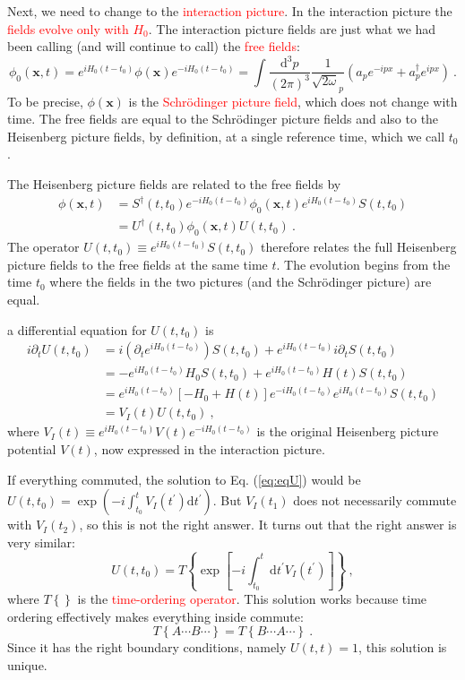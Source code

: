 \documentclass[11pt,a4paper]{article}
\renewcommand{\vec}[1]{\boldsymbol{#1}}
\newcommand{\dif}{\mathrm{d}}
\begin{document}
Next, we need to change to the \textcolor{red}{interaction picture}. In the interaction picture the \textcolor{red}{fields evolve only with $H_0$}. The interaction picture fields are just what we had been calling (and will continue to call) the \textcolor{red}{free fields}:
\begin{equation}
\phi_0(\vec{x}, t) = e^{iH_0(t-t_0)} \phi(\vec{x}) e^{-iH_0(t-t_0)} = \int \dfrac{\dif^3 p}{(2\pi)^3} \dfrac{1}{\sqrt{2\omega}_p} (a_p e^{-ipx} + a^\dagger_p e^{ipx} ) ~.
\end{equation}
To be precise, $\phi(\vec{x})$ is the \textcolor{red}{Schr\"odinger picture field}, which does not change with time. The free fields are equal to the Schr\"odinger picture fields and also to the Heisenberg picture fields, by definition, at a single reference time, which we call $t_0$.

The Heisenberg picture fields are related to the free fields by
\begin{align}
\nonumber \phi(\vec{x}, t) &= S^\dagger(t, t_0) e^{-iH_0(t-t_0)} \phi_0(\vec{x}, t) e^{iH_0(t-t_0)} S(t, t_0) \\
&= U^\dagger(t, t_0) \phi_0(\vec{x}, t) U(t, t_0) ~.
\end{align}
The operator $U(t,t_0) \equiv e^{iH_0(t-t_0)} S(t,t_0)$ therefore relates the full Heisenberg picture fields to the free fields at the same time $t$. The evolution begins from the time $t_0$ where the fields in the two pictures (and the Schr\"odinger picture) are equal.

a differential equation for $U(t, t_0)$ is  
\begin{align}
\nonumber i \partial_t U(t, t_0) &= i\left(\partial_t e^{iH_0(t-t_0)} \right) S(t, t_0) + e^{iH_0(t-t_0)} i \partial_t S(t, t_0) \\
\nonumber &= -e^{iH_0(t-t_0)} H_0 S(t, t_0) +e^{iH_0(t-t_0)} H(t) S(t, t_0) \\
\nonumber &= e^{iH_0(t-t_0)} [-H_0 +H(t)] e^{-iH_0(t-t_0)} e^{iH_0(t-t_0)} S(t, t_0) \\
&= V_I(t) U(t, t_0) ~,
\label{eq:eqU}
\end{align}
where $V_I(t) \equiv e^{iH_0 (t-t_0)} V(t) e^{-iH_0(t-t_0)}$ is the original Heisenberg picture potential $V(t)$, now expressed in the interaction picture.

If everything commuted, the solution to Eq. (\ref{eq:eqU}) would be $U(t, t_0) = \exp \left(-i \int_{t_0}^t V_I(t^\prime) \dif t^\prime \right)$. But $V_I(t_1)$ does not necessarily commute with $V_I(t_2)$, so this is not the right answer. It turns out that the right answer is very similar:
\begin{equation}
U(t, t_0) = T \left\{ \exp \left[-i \int_{t_0}^t \dif t^\prime V_I(t^\prime) \right] \right\}  ~,
\end{equation}
where $T\left\{ \right\}$ is the \textcolor{red}{time-ordering operator}. This solution works because time ordering effectively makes everything inside commute:
\begin{equation}
T\left\{A \cdots B \cdots \right\} = T\left\{B \cdots A \cdots \right\} ~.
\end{equation}
Since it has the right boundary conditions, namely $U(t, t) = 1$, this solution is unique.
\end{document}
